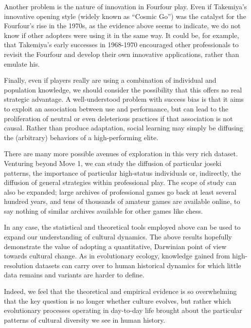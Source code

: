 \documentclass[12pt]{article}
\begin{document}
Another problem is the nature of innovation in Fourfour play. Even if Takemiya's innovative opening style (widely known as ``Cosmic Go'') was the catalyst for the Fourfour's rise in the 1970s, as the evidence above seems to indicate, we do not know if other adopters were using it in the same way. It could be, for example, that Takemiya's early successes in 1968-1970 encouraged other professionals to revisit the Fourfour and develop their own innovative applications, rather than emulate his.

Finally, even if players really are using a combination of individual and population knowledge, we should consider the possibility that this offers no real strategic advantage. A well-understood problem with success bias is that it aims to exploit an association between use and performance, but can lead to the proliferation of neutral or even deleterious practices if that association is not causal. Rather than produce adaptation, social learning may simply be diffusing the (arbitrary) behaviors of a high-performing elite.

There are many more possible avenues of exploration in this very rich dataset. Venturing beyond Move 1, we can study the diffusion of particular joseki patterns, the importance of particular high-status individuals or, indirectly, the diffusion of general strategies within professional play. The scope of study can also be expanded; large archives of professional games go back at least several hundred years, and tens of thousands of amateur games are available online, to say nothing of similar archives available for other games like chess.

In any case, the statistical and theoretical tools employed above can be used to expand our understanding of cultural dynamics. The above results hopefully demonstrate the value of adopting a quantitative, Darwinian point of view towards cultural change. As in evolutionary ecology, knowledge gained from high-resolution datasets can carry over to human historical dynamics for which little data remains and variants are harder to define.

Indeed, we feel that the theoretical and empirical evidence is so overwhelming that the key question is no longer whether culture evolves, but rather which evolutionary processes operating in day-to-day life brought about the particular patterns of cultural diversity we see in human history.



\end{document}
